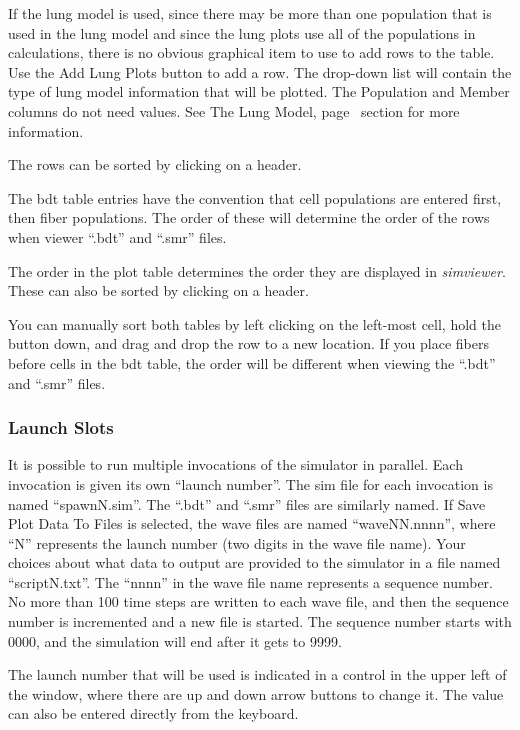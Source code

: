 \documentclass[12pt,openany,oneside]{book}
\newcommand{\tiref}[1]{#1, page~\pageref{#1}}
\newcommand{\prog}[1]{\textit{{#1}}}
\newcommand{\ext}[1]{{{``.#1''}}}
\newcommand{\inquotes}[1]{{{``#1''}}}
\begin{document}
If the lung model is used, since there may be more than one population
that is used in the lung model and since the lung plots use all of the
populations in calculations, there is no obvious graphical item to use to
add rows to the table. Use the Add Lung Plots button to add a row. The
drop-down list will contain the type of lung model information that will be
plotted. The Population and Member columns do not need values. See
\tiref{The Lung Model} section for more information.

The rows can be sorted by clicking on a header.

The bdt table entries have the convention that cell populations are
entered first, then fiber populations. The order of these will determine
the order of the rows when viewer \ext{bdt} and \ext{smr} files. 

The order in the plot table determines the order they are displayed in
\prog{simviewer}. These can also be sorted by clicking on a header.

You can manually sort both tables by left clicking on the left-most cell,
hold the button down, and drag and drop the row to a new location. If you
place fibers before cells in the bdt table, the order will be different
when viewing the \ext{bdt} and \ext{smr} files.


\subsubsection{Launch Slots}

It is possible to run multiple invocations of the simulator in parallel.
Each invocation is given its own \inquotes{launch number}. The sim file
for each invocation is named \inquotes{spawnN.sim}. The \ext{bdt} and
\ext{smr} files are similarly named.  If Save Plot Data To Files is
selected, the wave files are named \inquotes{waveNN.nnnn}, where
\inquotes{N} represents the launch number (two digits in the wave file
name). Your choices about what data to output are provided to the
simulator in a file named \inquotes{scriptN.txt}. The \inquotes{nnnn} in
the wave file name represents a sequence number. No more than 100 time
steps are written to each wave file, and then the sequence number is
incremented and a new file is started. The sequence number starts with
0000, and the simulation will end after it gets to 9999.

The launch number that will be used is indicated in
a control in the upper left of the window, where there are up and down
arrow buttons to change it. The value can also be entered directly from
the keyboard.
\end{document}
